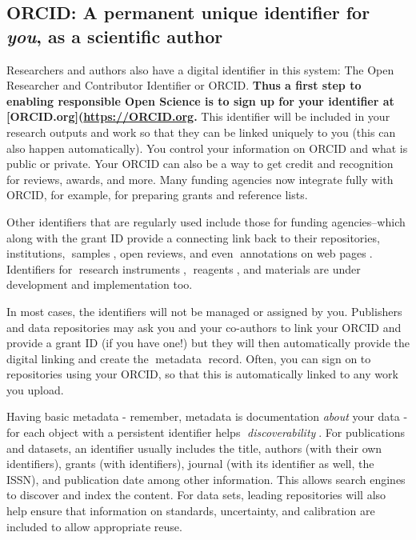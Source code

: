 \documentclass[
  letterpaper,
  DIV=11,
  numbers=noendperiod]{scrreport}
\begin{document}
\hypertarget{orcid-a-permanent-unique-identifier-for-you-as-a-scientific-author}{%
\subsection{\texorpdfstring{ORCID: A permanent unique identifier for
\emph{you}, as a scientific
author}{ORCID: A permanent unique identifier for you, as a scientific author}}\label{orcid-a-permanent-unique-identifier-for-you-as-a-scientific-author}}

Researchers and authors also have a digital identifier in this system:
The Open Researcher and Contributor Identifier or ORCID. \textbf{Thus a
first step to enabling responsible Open Science is to sign up for your
identifier at
{[}ORCID.org{]}(\href{https://orcid.org/}{https://ORCID.org}.} This
identifier will be included in your research outputs and work so that
they can be linked uniquely to you (this can also happen automatically).
You control your information on ORCID and what is public or private.
Your ORCID can also be a way to get credit and recognition for reviews,
awards, and more. Many funding agencies now integrate fully with ORCID,
for example, for preparing grants and reference lists.

Other identifiers that are regularly used include those for funding
agencies--which along with the grant ID provide a connecting link back
to their repositories, institutions, 📖samples📖, open reviews, and even
📖annotations on web pages📖. Identifiers for 📖research instruments📖,
📖reagents📖, and materials are under development and implementation
too.

In most cases, the identifiers will not be managed or assigned by you.
Publishers and data repositories may ask you and your co-authors to link
your ORCID and provide a grant ID (if you have one!) but they will then
automatically provide the digital linking and create the 📖metadata📖
record. Often, you can sign on to repositories using your ORCID, so that
this is automatically linked to any work you upload.

Having basic metadata - remember, metadata is documentation \emph{about}
your data - for each object with a persistent identifier helps
📖\emph{discoverability📖}. For publications and datasets, an identifier
usually includes the title, authors (with their own identifiers), grants
(with identifiers), journal (with its identifier as well, the ISSN), and
publication date among other information. This allows search engines to
discover and index the content. For data sets, leading repositories will
also help ensure that information on standards, uncertainty, and
calibration are included to allow appropriate reuse.
\end{document}
